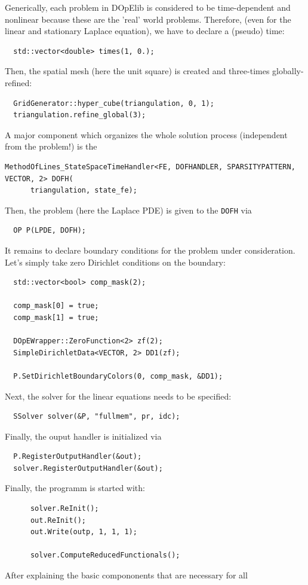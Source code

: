 \documentclass[prodmode,acmtoms]{acmsmall}
\numberwithin{equation}{section}
\begin{document}
Generically, each problem in DOpElib is considered to be time-dependent and nonlinear because
these are the 'real' world problems. Therefore, (even for the linear and stationary Laplace equation),
we have to declare a (pseudo) time:
\begin{lstlisting}
  std::vector<double> times(1, 0.);
\end{lstlisting}
Then, the spatial mesh (here the unit square) is created and three-times globally-refined:
\begin{lstlisting}
  GridGenerator::hyper_cube(triangulation, 0, 1);
  triangulation.refine_global(3);
\end{lstlisting}
A major component which organizes the whole solution process (independent from 
the problem!) is the 
\begin{lstlisting}
MethodOfLines_StateSpaceTimeHandler<FE, DOFHANDLER, SPARSITYPATTERN, VECTOR, 2> DOFH(
      triangulation, state_fe);
\end{lstlisting}
Then, the problem (here the Laplace PDE) is given to the \texttt{DOFH} via
\begin{lstlisting}
  OP P(LPDE, DOFH);
\end{lstlisting}
It remains to declare boundary conditions for the problem under consideration. 
Let's simply take zero Dirichlet conditions on the boundary:
\begin{lstlisting}
  std::vector<bool> comp_mask(2);

  comp_mask[0] = true;
  comp_mask[1] = true;

  DOpEWrapper::ZeroFunction<2> zf(2);
  SimpleDirichletData<VECTOR, 2> DD1(zf);

  P.SetDirichletBoundaryColors(0, comp_mask, &DD1);
\end{lstlisting}
Next, the solver for the linear equations needs to be specified:
\begin{lstlisting}
  SSolver solver(&P, "fullmem", pr, idc);
\end{lstlisting}
Finally, the ouput handler is initialized via
\begin{lstlisting}
  P.RegisterOutputHandler(&out);
  solver.RegisterOutputHandler(&out);
\end{lstlisting}
Finally, the programm is started with:
\begin{lstlisting}
      solver.ReInit();
      out.ReInit();
      out.Write(outp, 1, 1, 1);

      solver.ComputeReducedFunctionals();
\end{lstlisting}
After explaining the basic compononents that are necessary for all  
\end{document}
